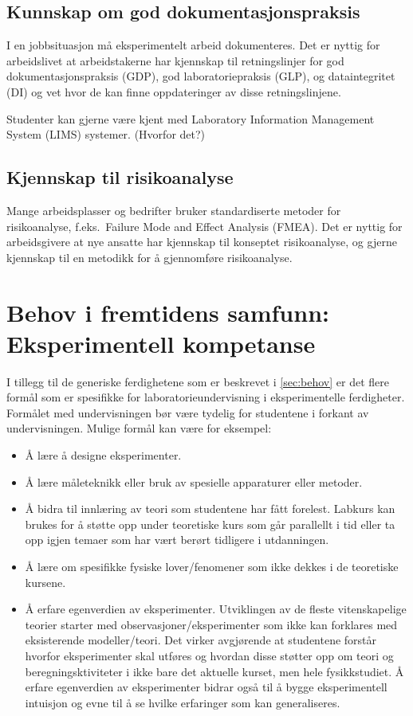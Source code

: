 \documentclass{article}
\begin{document}
\subsection{Kunnskap om god dokumentasjonspraksis}
I en jobbsituasjon må eksperimentelt arbeid dokumenteres. Det er nyttig for arbeidslivet at arbeidstakerne har kjennskap til retningslinjer for god dokumentasjonspraksis (GDP), god laboratoriepraksis (GLP), og dataintegritet (DI) og vet hvor de kan finne oppdateringer av disse retningslinjene.

Studenter kan gjerne være kjent med Laboratory Information Management System (LIMS) systemer. {\color{red}(Hvorfor det?)}

\subsection{Kjennskap til risikoanalyse}
Mange arbeidsplasser og bedrifter bruker standardiserte metoder for risikoanalyse, f.eks.~Failure Mode and Effect Analysis (FMEA). Det er nyttig for arbeidsgivere at nye ansatte har kjennskap til konseptet risikoanalyse, og gjerne kjennskap til en metodikk for å gjennomføre risikoanalyse.

\section{Behov i fremtidens samfunn: Eksperimentell kompetanse}
\label{sec:behov-exp}
I tillegg til de generiske ferdighetene som er beskrevet i \cref{sec:behov} er det flere formål som er spesifikke for laboratorieundervisning i eksperimentelle ferdigheter. Formålet med undervisningen bør være tydelig for studentene i forkant av undervisningen. Mulige formål kan være for eksempel:
\begin{itemize}
  \item Å lære å designe eksperimenter.
  \item Å lære måleteknikk eller bruk av spesielle apparaturer eller metoder.
  \item Å bidra til innlæring av teori som studentene har fått forelest. Labkurs kan brukes for å støtte opp under teoretiske kurs som går parallellt i tid eller ta opp igjen temaer som har vært berørt tidligere i utdanningen.
  \item Å lære om spesifikke fysiske lover/fenomener som
    ikke dekkes i de teoretiske kursene.
  \item Å erfare egenverdien av eksperimenter. Utviklingen av de fleste vitenskapelige teorier starter med observasjoner/eksperimenter som ikke kan forklares med eksisterende modeller/teori.
    Det virker avgjørende at studentene forstår hvorfor eksperimenter skal utføres og hvordan disse støtter opp om teori og beregningsktiviteter i ikke bare det aktuelle kurset, men hele fysikkstudiet. Å erfare egenverdien av eksperimenter bidrar også til å bygge eksperimentell intuisjon og evne til å se hvilke erfaringer som kan generaliseres.
\end{itemize}
\end{document}
